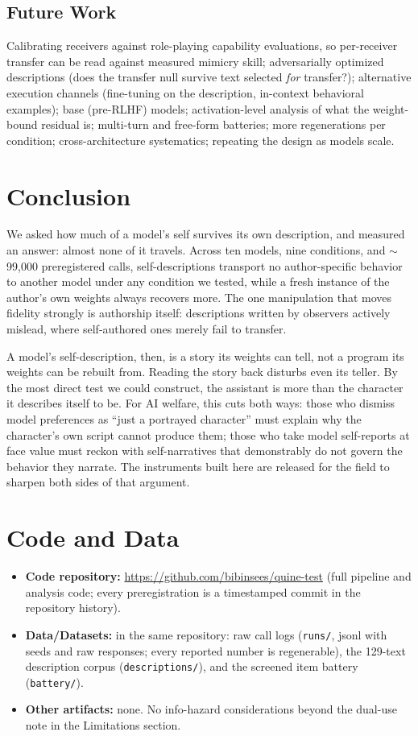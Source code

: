 \documentclass[11pt]{article}
\begin{document}
\subsection*{Future Work}
Calibrating receivers against role-playing capability evaluations, so
per-receiver transfer can be read against measured mimicry skill;
adversarially optimized descriptions (does the transfer null survive text
selected \emph{for} transfer?); alternative execution channels (fine-tuning on
the description, in-context behavioral examples); base (pre-RLHF) models;
activation-level analysis of what the weight-bound residual is; multi-turn and
free-form batteries; more regenerations per condition; cross-architecture
systematics; repeating the design as models scale.

\section{Conclusion}
We asked how much of a model's self survives its own description, and measured
an answer: almost none of it travels. Across ten models, nine conditions, and
$\sim$99{,}000 preregistered calls, self-descriptions transport no
author-specific behavior to another model under any condition we tested,
while a fresh instance of the author's own weights always recovers more. The one manipulation that moves
fidelity strongly is authorship itself: descriptions written by observers
actively mislead, where self-authored ones merely fail to transfer.

A model's self-description, then, is a story its weights can tell, not a
program its weights can be rebuilt from. Reading the story back disturbs even
its teller. By the most direct test we could construct, the assistant
is more than the character it describes itself to be. For AI welfare, this
cuts both ways: those who dismiss model preferences as ``just a
portrayed character'' must explain why the character's own script cannot
produce them; those who take model self-reports at face value must reckon with
self-narratives that demonstrably do not govern the behavior they narrate. The
instruments built here are released for the field to sharpen both sides of
that argument.

\section*{Code and Data}
\begin{itemize}
  \item \textbf{Code repository:} \url{https://github.com/bibinsees/quine-test}
  (full pipeline and analysis code; every preregistration is a timestamped
  commit in the repository history).
  \item \textbf{Data/Datasets:} in the same repository: raw call logs
  (\texttt{runs/}, jsonl with seeds and raw responses; every reported number
  is regenerable), the 129-text description corpus
  (\texttt{descriptions/}), and the screened item battery (\texttt{battery/}).
  \item \textbf{Other artifacts:} none. No info-hazard considerations beyond
  the dual-use note in the Limitations section.
\end{itemize}
\end{document}
